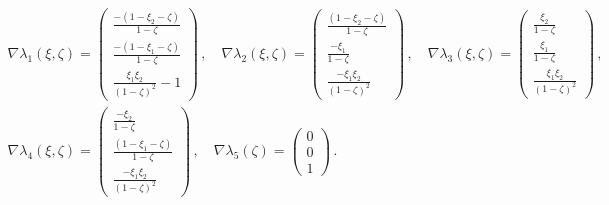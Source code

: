 \begin{equation}
	\begin{gathered}
    \nabla\lambda_1(\xi,\zeta)=\begin{pmatrix}\frac{-(1-\xi_2-\zeta)}{1-\zeta}\\\frac{-(1 -\xi_1-\zeta)}{1-\zeta}\\
        \frac{\xi_1\xi_2}{(1-\zeta)^2}-1\end{pmatrix}\,,\quad
    \nabla\lambda_2(\xi,\zeta)=\begin{pmatrix}\frac{(1-\xi_2-\zeta)}{1-\zeta}\\\frac{-\xi_1}{1-\zeta}\\
        \frac{-\xi_1\xi_2}{(1-\zeta)^2}\end{pmatrix}\,,\quad
    \nabla\lambda_3(\xi,\zeta)=\begin{pmatrix}\frac{\xi_2}{1-\zeta}\\\frac{\xi_1}{1-\zeta}\\
        \frac{\xi_1\xi_2}{(1-\zeta)^2}\end{pmatrix}\,,\\
    \nabla\lambda_4(\xi,\zeta)=\begin{pmatrix}\frac{-\xi_2}{1-\zeta}\\\frac{(1-\xi_1-\zeta)}{1-\zeta}\\
        \frac{-\xi_1\xi_2}{(1-\zeta)^2}\end{pmatrix}\,,\quad
    \nabla\lambda_5(\zeta)=\begin{pmatrix}0\\0\\1\end{pmatrix}\,.
	\end{gathered}
	\label{eq:PyramidAffineCoordGrad}
\end{equation}

